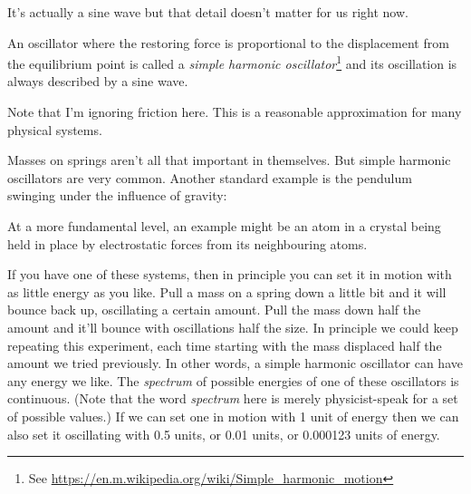 \documentclass[a4paper]{article}
\begin{document}
\begin{center}
\end{center}
It's actually a sine wave but that detail doesn't matter for us right now.

An oscillator where the restoring force is proportional to the displacement from the equilibrium point is called a {\em simple harmonic oscillator}\footnote{See \url{https://en.m.wikipedia.org/wiki/Simple_harmonic_motion}} and its oscillation is always described by a sine wave.

Note that I'm ignoring friction here. This is a reasonable approximation for many physical systems.

Masses on springs aren't all that important in themselves.
But simple harmonic oscillators are very common.
Another standard example is the pendulum swinging under the influence of gravity:

\begin{center}
\end{center}

At a more fundamental level, an example might be an atom in a crystal being held in place by electrostatic forces from its neighbouring atoms.

If you have one of these systems, then in principle you can set it in motion with as little energy as you like.
Pull a mass on a spring down a little bit and it will bounce back up, oscillating a certain amount.
Pull the mass down half the amount and it'll bounce with oscillations half the size.
In principle we could keep repeating this experiment, each time starting with the mass displaced half the amount we tried previously.
In other words, a simple harmonic oscillator can have any energy we like.
The {\em spectrum} of possible energies of one of these oscillators is continuous.
(Note that the word {\em spectrum} here is merely physicist-speak for a set of possible values.)
If we can set one in motion with 1 unit of energy then we can also set it oscillating with 0.5 units, or 0.01 units, or 0.000123 units of energy.
\end{document}
